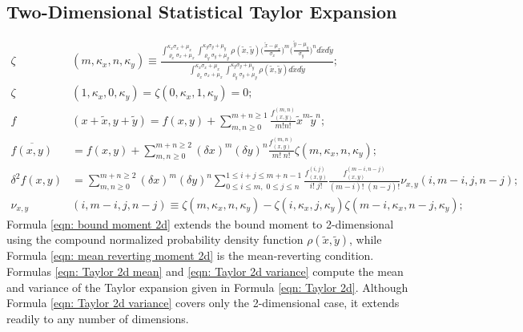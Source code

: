 \documentclass[twoside]{article}
\numberwithin{equation}{section}
\begin{document}
\subsection{Two-Dimensional Statistical Taylor Expansion}

\begin{align}
\label{eqn: bound moment 2d}
\zeta&(m, \kappa_x, n, \kappa_y) \equiv
	\frac{\int_{\varrho_x \sigma_x + \mu_x}^{\kappa_x \sigma_x + \mu_x} 
			\int_{\varrho_y \sigma_y + \mu_y}^{\kappa_y \sigma_y + \mu_y} 
			\rho(\tilde{x}, \tilde{y}) \big(\frac{\tilde{x} - \mu_x}{\sigma_x}\big)^m \big(\frac{\tilde{y} - \mu_y}{\sigma_y}\big)^n d \tilde{x} d \tilde{y}}
		   {\int_{\varrho_x \sigma_x + \mu_x}^{\kappa_x \sigma_x + \mu_x} 
			\int_{\varrho_y \sigma_y + \mu_y}^{\kappa_y \sigma_y + \mu_y}
			\rho(\tilde{x}, \tilde{y}) d \tilde{x} d \tilde{y}};\\
\label{eqn: mean reverting moment 2d}
\zeta&(1,\kappa_x,0,\kappa_y) = \zeta(0,\kappa_x,1,\kappa_y) = 0; \\
\label{eqn: Taylor 2d}
f&(x + \tilde{x}, y + \tilde{y}) = f(x, y) + \sum_{m, n \geq 0}^{m+n \geq 1} \frac{f^{(m,n)}_{(x,y)}}{m! n!} \tilde{x}^m \tilde{y}^n; \\
\label{eqn: Taylor 2d mean}
\overline{f(x,y)} &= f(x, y) + \sum_{m, n \geq 0}^{m+n \geq 2} (\delta x)^m (\delta y)^n \frac{f^{(m,n)}_{(x,y)}}{m!\;n!} \zeta(m, \kappa_x, n, \kappa_y);  \\
\label{eqn: Taylor 2d variance}
\delta^2 f(x, y) &= \sum_{m, n \geq 0}^{m+n \geq 2} (\delta x)^m (\delta y)^n \sum_{0 \leq i \leq m,\; 0 \leq j \leq n}^{1 \leq i + j \leq m + n - 1}
		\frac{f^{(i,j)}_{(x,y)}}{i!\;j!}\frac{f^{(m-i, n-j)}_{(x,y)}}{(m-i)!\;(n-j)!} \nu_{x,y}(i, m - i, j, n  -j); \\
\label{eqn: Taylor 2d covariance}
\nu_{x,y}&(i, m - i, j, n - j) \equiv \zeta(m, \kappa_x, n, \kappa_y) - \zeta(i, \kappa_x, j, \kappa_y) \zeta(m-i, \kappa_x, n-j, \kappa_y);
\end{align}
Formula \eqref{eqn: bound moment 2d} extends the bound moment to 2-dimensional using the compound normalized probability density function $\rho(\tilde{x}, \tilde{y})$, while Formula \eqref{eqn: mean reverting moment 2d} is the mean-reverting condition.
Formulas \eqref{eqn: Taylor 2d mean} and \eqref{eqn: Taylor 2d variance} compute the mean and variance of the Taylor expansion given in Formula \eqref{eqn: Taylor 2d}.
Although Formula \eqref{eqn: Taylor 2d variance} covers only the 2-dimensional case, it extends readily to any number of dimensions.
\end{document}
